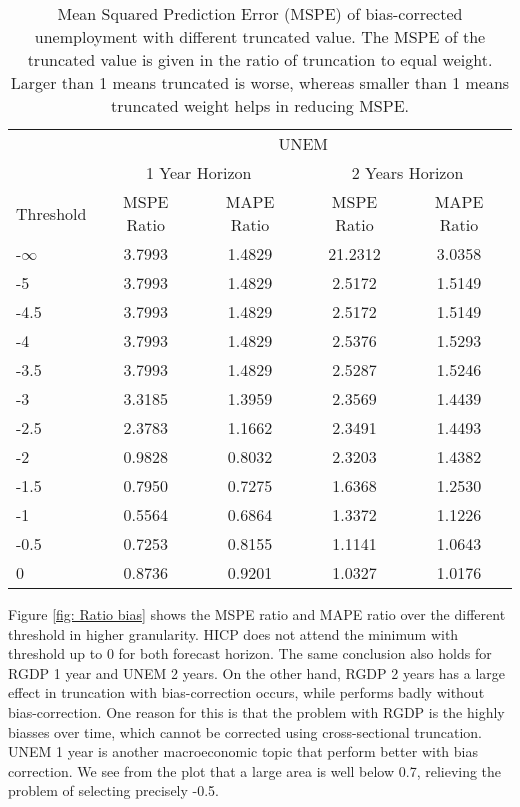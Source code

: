 \documentclass[11pt]{article}
\begin{document}
\begin{table}[!h]
	\centering
	\caption{Mean Squared Prediction Error (MSPE) of bias-corrected unemployment with different truncated value. The MSPE of the truncated value is given in the ratio of truncation to equal weight. Larger than 1 means truncated is worse, whereas smaller than 1 means truncated weight helps in reducing MSPE.}
	\label{tab: MSPE UNEM bias}
	\begin{tabular}{lcccc}
		\hline
		&                        \multicolumn{4}{c}{UNEM}                         \\
		\cmidrule(lr){2-5}                              & \multicolumn{2}{c}{1 Year Horizon} & \multicolumn{2}{c}{2 Years Horizon} \\
		\cmidrule(lr){2-3} \cmidrule(lr){4-5}
		Threshold & MSPE Ratio & MAPE Ratio  & MSPE Ratio & MAPE Ratio  \\ \hline
		-$\infty$ & 3.7993 & 1.4829 & 21.2312 & 3.0358\\ 
		-5 & 3.7993 & 1.4829 & 2.5172 & 1.5149\\ 
		-4.5 & 3.7993 & 1.4829 & 2.5172 & 1.5149\\ 
		-4 & 3.7993 & 1.4829 & 2.5376 & 1.5293\\ 
		-3.5 & 3.7993 & 1.4829 & 2.5287 & 1.5246\\ 
		-3 & 3.3185 & 1.3959 & 2.3569 & 1.4439\\ 
		-2.5 & 2.3783 & 1.1662 & 2.3491 & 1.4493\\ 
		-2 & 0.9828 & 0.8032 & 2.3203 & 1.4382\\ 
		-1.5 & 0.7950 & 0.7275 & 1.6368 & 1.2530\\ 
		-1 & 0.5564 & 0.6864 & 1.3372 & 1.1226\\ 
		-0.5 & 0.7253 & 0.8155 & 1.1141 & 1.0643\\ 
		0 & 0.8736 & 0.9201 & 1.0327 & 1.0176\\ \hline
	\end{tabular}
\end{table}

Figure \ref{fig: Ratio bias} shows the MSPE ratio and MAPE ratio over the different threshold in higher granularity. HICP does not attend the minimum with threshold up to 0 for both forecast horizon. The same conclusion also holds for RGDP 1 year and UNEM 2 years. On the other hand, RGDP 2 years has a large effect in truncation with bias-correction occurs, while performs badly without bias-correction. One reason for this is that the problem with RGDP is the highly biasses over time, which cannot be corrected using cross-sectional truncation. UNEM 1 year is another macroeconomic topic that perform better with bias correction. We see from the plot that a large area is well below 0.7, relieving the problem of selecting precisely -0.5.
\end{document}
